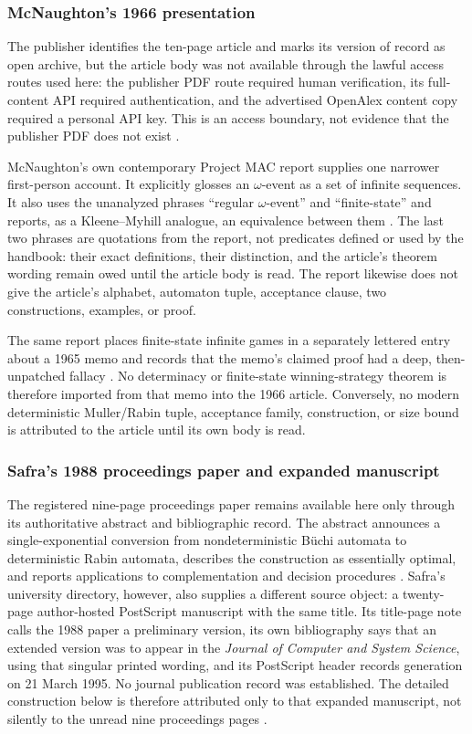 \subsubsection{McNaughton's 1966 presentation}
The publisher identifies the ten-page article and marks its version of record
as open archive, but the article body was not available through the lawful
access routes used here: the publisher PDF route required human verification,
its full-content API required authentication, and the advertised OpenAlex content
copy required a personal API key.  This is an access boundary, not evidence
that the publisher PDF does not exist \cite{McNaughton1966}.

McNaughton's own contemporary Project MAC report supplies one narrower
first-person account.  It explicitly glosses an \(\omega\)-event as a set of
infinite sequences.  It also uses the unanalyzed phrases ``regular
\(\omega\)-event'' and ``finite-state'' and reports, as a Kleene--Myhill
analogue, an equivalence between them \cite[p.~58]{MITProjectMAC1966}.  The
last two phrases are quotations from the report, not predicates defined or
used by the handbook: their exact definitions, their distinction, and the
article's theorem wording remain owed until the article body is read.  The
report likewise does not give the article's alphabet, automaton tuple,
acceptance clause, two constructions, examples, or proof.

The same report places finite-state infinite games in a separately lettered
entry about a 1965 memo and records that the memo's claimed proof had a deep,
then-unpatched fallacy \cite[p.~58]{MITProjectMAC1966}.  No determinacy or
finite-state winning-strategy theorem is therefore imported from that memo
into the 1966 article.  Conversely, no modern deterministic Muller/Rabin tuple,
acceptance family, construction, or size bound is attributed to the article
until its own body is read.

\subsubsection{Safra's 1988 proceedings paper and expanded manuscript}
The registered nine-page proceedings paper remains available here only through
its authoritative abstract and bibliographic record.  The abstract announces a
single-exponential conversion from nondeterministic B\"uchi automata to
deterministic Rabin automata, describes the construction as essentially
optimal, and reports applications to complementation and decision procedures
\cite{Safra1988}.  Safra's university directory, however, also supplies a
different source object: a twenty-page author-hosted PostScript manuscript with
the same title.  Its title-page note calls the 1988 paper a preliminary version,
its own bibliography says that an extended version was to appear in the
\emph{Journal of Computer and System Science}, using that singular printed
wording, and its PostScript header records
generation on 21 March 1995.  No journal publication record was established.
The detailed construction below is therefore attributed only to that expanded
manuscript, not silently to the unread nine proceedings pages
\cite{Safra1995Extended}.

